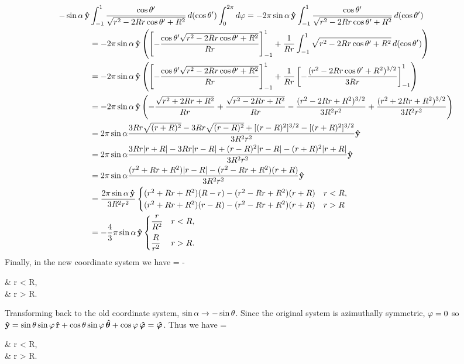 \begin{solution}
\begin{align*}
		-\sin\alpha \,\vb{\hat{y}} &\int_{-1}^1 \frac{\cos\theta'}{\sqrt{r^2 - 2 R r  \cos\theta' + R^2}} \dd{(\cos\theta')} \int_0^{2\pi} \dd{\varphi}
		= -2\pi \sin\alpha \,\vb{\hat{y}} \int_{-1}^1 \frac{\cos\theta'}{\sqrt{r^2 - 2 R r  \cos\theta' + R^2}} \dd{(\cos\theta')} \\
		&= -2\pi \sin\alpha \,\vb{\hat{y}} \left( \left[ -\frac{\cos\theta' \sqrt{r^2 - 2 R r \cos\theta' + R^2}}{R r} \right]_{-1}^1 + \frac{1}{R r} \int_{-1}^1 \sqrt{r^2 - 2 R r \cos\theta' + R^2} \dd{(\cos\theta')} \right) \\
		&= -2\pi \sin\alpha \,\vb{\hat{y}} \left( \left[ -\frac{\cos\theta' \sqrt{r^2 - 2 R r \cos\theta' + R^2}}{R r} \right]_{-1}^1 + \frac{1}{R r} \left[ -\frac{(r^2 - 2 R r \cos\theta' + R^2)^{3/2}}{3 R r} \right]_{-1}^1\right) \\
		&= -2\pi \sin\alpha \,\vb{\hat{y}} \left( -\frac{\sqrt{r^2 + 2 R r + R^2}}{R r} + \frac{\sqrt{r^2 - 2 R r + R^2}}{R r} - \frac{(r^2 - 2 R r + R^2)^{3/2}}{3 R^2 r^2} + \frac{(r^2 + 2 R r + R^2)^{3/2}}{3 R^2 r^2} \right) \\
		&= 2\pi \sin\alpha \frac{3 R r \sqrt{(r + R)^2} - 3 R r \sqrt{(r - R)^2} + [(r - R)^2]^{3/2} - [(r + R)^2]^{3/2}}{3 R^2 r^2} \vb{\hat{y}} \\
		&= 2\pi \sin\alpha \frac{3 R r \abs{r + R} - 3 R r \abs{r - R} + (r - R)^2 \abs{r - R} - (r + R)^2 \abs{r + R}}{3 R^2 r^2} \vb{\hat{y}} \\
		&= 2\pi \sin\alpha \frac{(r^2 + R r + R^2) \abs{r - R} - (r^2 - R r + R^2) (r + R)}{3 R^2 r^2} \vb{\hat{y}} \\
		&= \frac{2\pi \sin\alpha \, \vb{\hat{y}}}{3 R^2 r^2} \begin{cases}
			(r^2 + R r + R^2) (R - r) - (r^2 - R r + R^2) (r + R) & r < R, \\
			(r^2 + R r + R^2) (r - R) - (r^2 - R r + R^2) (r + R) & r > R
		\end{cases} \\
		&= -\frac{4}{3} \pi \sin\alpha \, \vb{\hat{y}} \begin{cases}
			\dfrac{r}{R^2} & r < R, \\[2ex]
			\dfrac{R}{r^2} & r > R.
		\end{cases}
	\end{align*}
	Finally, in the new coordinate system we have
	\beq
		\vAx = - \sin\alp \,\yh \begin{cases}
			 & r < R, \\[2ex]
			 & r > R.
		\end{cases}
	\eeq
	
	Transforming back to the old coordinate system, $\sin\alpha \to - \sin\theta$.  Since the original system is azimuthally symmetric, $\varphi = 0$ so $\vb{\hat{y}} = \sin\theta \sin\varphi \,\vb{\hat{r}} + \cos\theta \sin\varphi \,\boldsymbol{\hat{\theta}} + \cos\varphi \,\boldsymbol{\hat{\varphi}} = \boldsymbol{\hat{\varphi}}$.  Thus we have
	\beq
		\vAx =  \sin\tht \,\phh \begin{cases}
			 & r < R, \\[2ex]
			 & r > R.
		\end{cases}
	\eeq
	

\end{solution}
